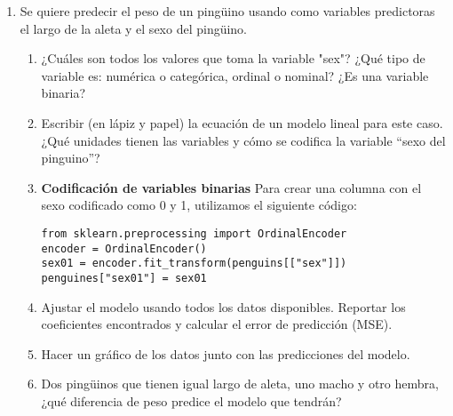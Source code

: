 \documentclass[a4paper,11pt]{article}
\theoremstyle{definition}
\begin{document}
\begin{enumerate}
\begin{enumerate}
En base a estos gr\'aficos, si quisiéramos predecir la ganancia mediante un modelo lineal utilizando una sola variable predictora, ¿cu\'al variable utilizar\'ia? Diseñar un experimento para verificar su respuesta.
\item En este ejemplo, ¿considera que un modelo lineal multivariado ayudar\'ia a predecir mejor la ganancia? Realizar un experimento para verificar su respuesta.
\end{enumerate}

\item Se quiere predecir el peso de un ping\"uino usando como variables predictoras el largo de la aleta y el sexo del ping\"uino.
\begin{enumerate}
\item ¿Cu\'ales son todos los valores que toma la variable "sex"? ¿Qu\'e tipo de variable es: numérica o categórica, ordinal o nominal? ¿Es una variable binaria?

\item Escribir (en lápiz y papel) la ecuación de un modelo lineal para este caso. ¿Qué unidades tienen las variables y cómo se codifica la variable “sexo del pinguino”?

\item \textbf{Codificación de variables binarias} Para crear una columna con el sexo codificado como 0 y 1, utilizamos el siguiente c\'odigo:
\begin{lstlisting}
from sklearn.preprocessing import OrdinalEncoder
encoder = OrdinalEncoder()
sex01 = encoder.fit_transform(penguins[["sex"]])
penguines["sex01"] = sex01
\end{lstlisting}

\item Ajustar el modelo usando todos los datos disponibles. Reportar los coeficientes encontrados y calcular el error de predicción (MSE).
\item Hacer un gráfico de los datos junto con las predicciones del modelo.
\item Dos ping\"uinos que tienen igual largo de aleta, uno macho y otro hembra, ¿qué diferencia de peso predice el modelo que tendrán?
\end{enumerate}


\end{enumerate}
\end{document}
